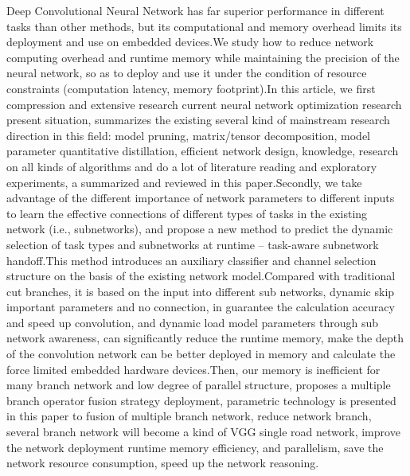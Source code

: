 \begin{abstract*}

Deep Convolutional Neural Network has far superior performance in different tasks than other methods, but its computational and memory overhead limits its deployment and use on embedded devices.We study how to reduce network computing overhead and runtime memory while maintaining the precision of the neural network, so as to deploy and use it under the condition of resource constraints (computation latency, memory footprint).In this article, we first compression and extensive research current neural network optimization research present situation, summarizes the existing several kind of mainstream research direction in this field: model pruning, matrix/tensor decomposition, model parameter quantitative distillation, efficient network design, knowledge, research on all kinds of algorithms and do a lot of literature reading and exploratory experiments, a summarized and reviewed in this paper.Secondly, we take advantage of the different importance of network parameters to different inputs to learn the effective connections of different types of tasks in the existing network (i.e., subnetworks), and propose a new method to predict the dynamic selection of task types and subnetworks at runtime -- task-aware subnetwork handoff.This method introduces an auxiliary classifier and channel selection structure on the basis of the existing network model.Compared with traditional cut branches, it is based on the input into different sub networks, dynamic skip important parameters and no connection, in guarantee the calculation accuracy and speed up convolution, and dynamic load model parameters through sub network awareness, can significantly reduce the runtime memory, make the depth of the convolution network can be better deployed in memory and calculate the force limited embedded hardware devices.Then, our memory is inefficient for many branch network and low degree of parallel structure, proposes a multiple branch operator fusion strategy deployment, parametric technology is presented in this paper to fusion of multiple branch network, reduce network branch, several branch network will become a kind of VGG single road network, improve the network deployment runtime memory efficiency, and parallelism, save the network resource consumption, speed up the network reasoning.

\end{abstract*}
